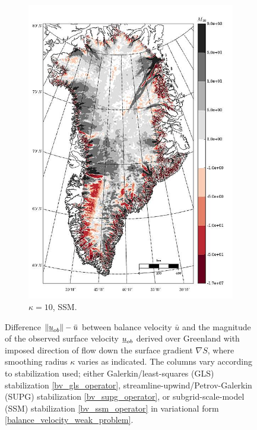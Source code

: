 \begin{figure}
\begin{subfigure}[b]{0.25\linewidth}
    \includegraphics[width=\linewidth]{images/balance_velocity/greenland/misfit_5H_kappa_10_SSM.jpg}
  \caption{$\kappa = 10$, SSM.}
  \label{greenland_bv_image_kappa_10_SSM_misfit}
  \end{subfigure}
 
  \caption[Greenland balance-velocity misfit with $\mathbf{d}^{\text{data}} = -\nabla S$.]{Difference $\Vert \underline{u}_{ob} \Vert - \bar{u}$ between balance velocity $\bar{u}$ and the magnitude of the observed surface velocity $\underline{u}_{ob}$ derived over Greenland with imposed direction of flow down the surface gradient $\nabla S$, where smoothing radius $\kappa$ varies as indicated.  The columns vary according to stabilization used; either Galerkin/least-squares (GLS) stabilization \cref{bv_gls_operator}, streamline-upwind/Petrov-Galerkin (SUPG) stabilization \cref{bv_supg_operator}, or subgrid-scale-model (SSM) stabilization \cref{bv_ssm_operator} in variational form \cref{balance_velocity_weak_problem}.}

  \label{greenland_bv_image_misfit}

\end{figure}


